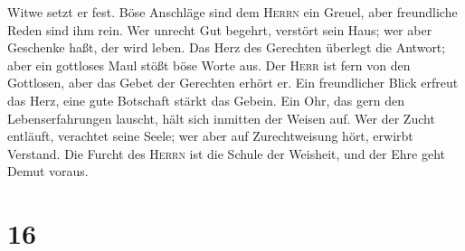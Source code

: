 Witwe setzt er fest.  Böse Anschläge sind dem
\textsc{Herrn} ein Greuel, aber freundliche Reden sind ihm rein.
 Wer unrecht Gut begehrt, verstört sein Haus; wer aber
Geschenke haßt, der wird leben.  Das Herz des Gerechten
überlegt die Antwort; aber ein gottloses Maul stößt böse Worte aus.
 Der \textsc{Herr} ist fern von den Gottlosen, aber das
Gebet der Gerechten erhört er.  Ein freundlicher Blick
erfreut das Herz, eine gute Botschaft stärkt das Gebein. 
Ein Ohr, das gern den Lebenserfahrungen lauscht, hält sich inmitten der
Weisen auf.  Wer der Zucht entläuft, verachtet seine
Seele; wer aber auf Zurechtweisung hört, erwirbt Verstand.
 Die Furcht des \textsc{Herrn} ist die Schule der
Weisheit, und der Ehre geht Demut voraus.

\hypertarget{section-15}{%
\section{16}\label{section-15}}

